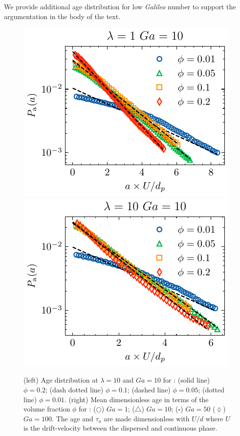 We provide additional age distribution for low \textit{Galileo} number to support the argumentation in the body of the text. 
\begin{figure}[h!]
    \centering
    \includegraphics[height = 0.3\textwidth]{image/HOMOGENEOUS_NEW/Dist/Pa_l_1_Ga_10.pdf}
    \includegraphics[height = 0.3\textwidth]{image/HOMOGENEOUS_NEW/Dist/Pa_l_10_Ga_10.pdf}
    \caption{(left) Age distribution at $\lambda = 10$ and $Ga = 10$ for : (solid line) $\phi = 0.2$; (dash dotted line) $\phi = 0.1$; (dashed line) $\phi =0.05$; (dotted line) $\phi = 0.01$. 
    (right) Mean dimensionless age in terms of the volume fraction $\phi$ for : 
    ($\pmb\bigcirc$) $Ga=1$; ($\pmb\triangle$) $ Ga = 10$; ($\pmb\square$) $Ga = 50$ ($\pmb\lozenge$) $Ga =100$.
    The age and $\tau_a$ are made dimensionless with $U/d$ where $U$ is the drift-velocity between the dispersed and continuous phase.  }
    \label{fig:age_picture_low_ga}
\end{figure}
